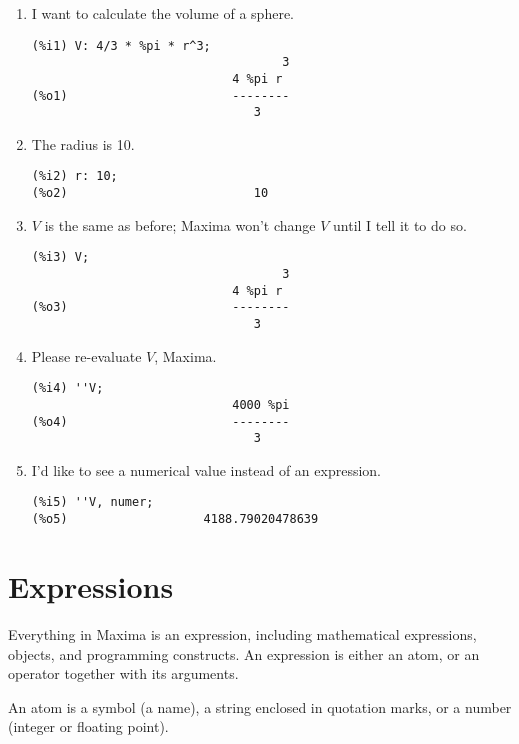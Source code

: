 \documentclass[12pt]{article}
\begin{document}
\begin{enumerate}

\item I want to calculate the volume of a sphere.
\begin{verbatim}
(%i1) V: 4/3 * %pi * r^3;
                                   3
                            4 %pi r
(%o1)                       --------
                               3
\end{verbatim}

\item The radius is 10.
\begin{verbatim}
(%i2) r: 10;
(%o2)                          10
\end{verbatim}

\item $V$ is the same as before; Maxima won't change $V$ until I tell it to do so.
\begin{verbatim}
(%i3) V;
                                   3
                            4 %pi r
(%o3)                       --------
                               3
\end{verbatim}

\item Please re-evaluate $V$, Maxima.
\begin{verbatim}
(%i4) ''V;
                            4000 %pi
(%o4)                       --------
                               3
\end{verbatim}

\item I'd like to see a numerical value instead of an expression.
\begin{verbatim}
(%i5) ''V, numer;
(%o5)                   4188.79020478639
\end{verbatim}

\end{enumerate}

\section{Expressions}

Everything in Maxima is an expression,
including mathematical expressions, objects, and programming constructs.
An expression is either an atom, or an operator together with its arguments.

An atom is a symbol (a name), a string enclosed in quotation marks,
or a number (integer or floating point).
\end{document}
